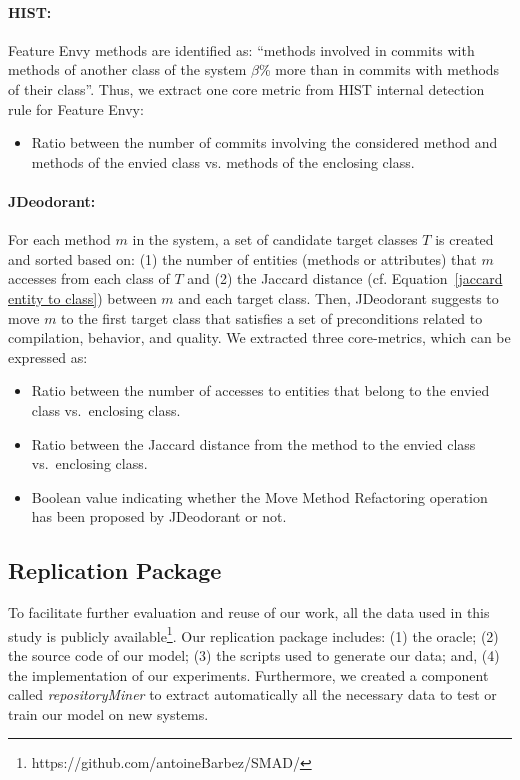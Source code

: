 \paragraph{HIST:}
Feature Envy methods are identified as: ``methods involved in commits with methods of another class of the system $\beta$\% more than in commits with methods of their class''. Thus, we extract one core metric from HIST internal detection rule for Feature Envy:
\begin{itemize}
\item Ratio between the number of commits involving the considered method and methods of the envied class vs. methods of the enclosing class. 
\end{itemize}

\paragraph{JDeodorant:}
For each method $m$ in the system, a set of candidate target classes $T$ is created and sorted based on: (1) the number of entities (methods or attributes) that $m$ accesses from each class of $T$ and (2) the Jaccard distance (cf. Equation~\ref{jaccard entity to class}) between $m$ and each target class. Then, JDeodorant suggests to move $m$ to the first target class that satisfies a set of preconditions related to compilation, behavior, and quality. We extracted three core-metrics, which can be expressed as:
\begin{itemize}
\item Ratio between the number of accesses to entities that belong to the envied class vs.\ enclosing class.
\item Ratio between the Jaccard distance from the method to the envied class vs.\ enclosing class.
\item Boolean value indicating whether the Move Method Refactoring operation has been proposed by JDeodorant or not.
\end{itemize}

\subsection{Replication Package}
To facilitate further evaluation and reuse of our work, all the data used in this study is publicly available\footnote{https://github.com/antoineBarbez/SMAD/}. Our replication package includes: (1) the oracle; (2) the source code of our model; (3) the scripts used to generate our data; and, (4) the implementation of our experiments. Furthermore, we created a component called \textit{repositoryMiner} to extract automatically all the necessary data to test or train our model on new systems.